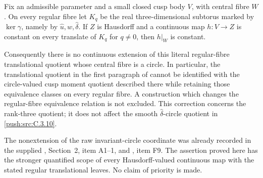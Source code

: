 \begin{proposition}\label{push:src:C.3.12}
Fix an admissible parameter and a small closed cusp body $V$, with
central fibre $W$. On every regular fibre let $K_q$ be the real
three-dimensional subtorus marked by $\ker\gamma$, namely by
$\widehat u,\widehat w,\widehat\delta$.
If $Z$ is Hausdorff and a continuous map $h:V\to Z$ is constant
on every translate of $K_q$ for $q\ne0$, then $h|_W$ is constant.

Consequently there is no continuous extension of this literal
regular-fibre translational quotient whose central fibre is a
circle. In particular, the translational quotient in the first
paragraph of \citet[Remark 8.3]{E26} cannot be identified with the
circle-valued cusp moment quotient described there while retaining
those equivalence classes on every regular fibre. A construction
which changes the regular-fibre equivalence relation is not excluded.
This correction concerns the rank-three quotient; it does not affect
the smooth $\widehat\delta$-circle quotient in \ref{push:src:C.3.10}.
\end{proposition}
The nonextension of the raw invariant-circle coordinate was already
recorded in the supplied ,
Section~2, item A1--1, and
, item F9.
The assertion proved here has the stronger quantified scope of every
Hausdorff-valued continuous map with the stated regular translational
leaves. No claim of priority is made.

